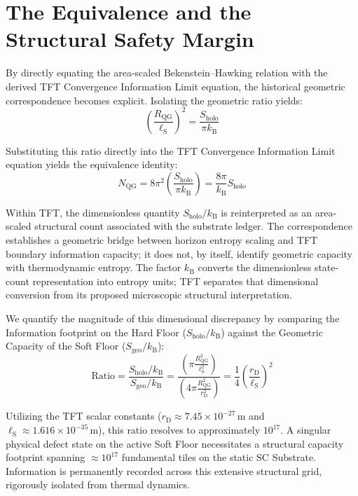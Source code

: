 \section{The Equivalence and the Structural Safety Margin}

By directly equating the area-scaled Bekenstein--Hawking relation with the derived TFT Convergence Information Limit equation, the historical geometric correspondence becomes explicit. Isolating the geometric ratio yields:
\begin{equation}
    \left(\frac{R_{\mathrm{QG}}}{\ell_{\mathrm{S}}}\right)^2 = \frac{S_{\mathrm{holo}}}{\pi k_{\mathrm{B}}}
\end{equation}

Substituting this ratio directly into the TFT Convergence Information Limit equation yields the equivalence identity:
\begin{equation}
    N_{\mathrm{QG}} = 8\pi^2 \left( \frac{S_{\mathrm{holo}}}{\pi k_{\mathrm{B}}} \right) = \frac{8\pi}{k_{\mathrm{B}}} S_{\mathrm{holo}}
\end{equation}

Within TFT, the dimensionless quantity $S_{\mathrm{holo}}/k_{\mathrm{B}}$ is reinterpreted as an area-scaled structural count associated with the substrate ledger. The correspondence establishes a geometric bridge between horizon entropy scaling and TFT boundary information capacity; it does not, by itself, identify geometric capacity with thermodynamic entropy. The factor $k_{\mathrm{B}}$ converts the dimensionless state-count representation into entropy units; TFT separates that dimensional conversion from its proposed microscopic structural interpretation.

We quantify the magnitude of this dimensional discrepancy by comparing the Information footprint on the Hard Floor ($S_{\mathrm{holo}}/k_{\mathrm{B}}$) against the Geometric Capacity of the Soft Floor ($S_{\mathrm{geo}}/k_{\mathrm{B}}$):
\begin{equation}
    \text{Ratio} = \frac{S_{\mathrm{holo}}/k_{\mathrm{B}}}{S_{\mathrm{geo}}/k_{\mathrm{B}}} = \frac{\left( \pi \frac{R_{\mathrm{QG}}^2}{\ell_{\mathrm{S}}^2} \right)}{\left( 4\pi \frac{R_{\mathrm{QG}}^2}{r_{\mathrm{D}}^2} \right)} = \frac{1}{4}\left(\frac{r_{\mathrm{D}}}{\ell_{\mathrm{S}}}\right)^2
\end{equation}

Utilizing the TFT scalar constants ($r_{\mathrm{D}} \approx 7.45 \times 10^{-27} \, \mathrm{m}$ and $\ell_{\mathrm{S}} \approx 1.616 \times 10^{-35} \, \mathrm{m}$), this ratio resolves to approximately $10^{17}$. A singular physical defect state on the active Soft Floor necessitates a structural capacity footprint spanning $\approx 10^{17}$ fundamental tiles on the static SC Substrate. Information is permanently recorded across this extensive structural grid, rigorously isolated from thermal dynamics.

